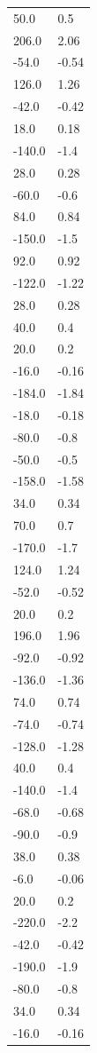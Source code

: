 \begin{longtable}{ll}
50.0 & 0.5 \\
206.0 & 2.06 \\
-54.0 & -0.54 \\
126.0 & 1.26 \\
-42.0 & -0.42 \\
18.0 & 0.18 \\
-140.0 & -1.4 \\
28.0 & 0.28 \\
-60.0 & -0.6 \\
84.0 & 0.84 \\
-150.0 & -1.5 \\
92.0 & 0.92 \\
-122.0 & -1.22 \\
28.0 & 0.28 \\
40.0 & 0.4 \\
20.0 & 0.2 \\
-16.0 & -0.16 \\
-184.0 & -1.84 \\
-18.0 & -0.18 \\
-80.0 & -0.8 \\
-50.0 & -0.5 \\
-158.0 & -1.58 \\
34.0 & 0.34 \\
70.0 & 0.7 \\
-170.0 & -1.7 \\
124.0 & 1.24 \\
-52.0 & -0.52 \\
20.0 & 0.2 \\
196.0 & 1.96 \\
-92.0 & -0.92 \\
-136.0 & -1.36 \\
74.0 & 0.74 \\
-74.0 & -0.74 \\
-128.0 & -1.28 \\
40.0 & 0.4 \\
-140.0 & -1.4 \\
-68.0 & -0.68 \\
-90.0 & -0.9 \\
38.0 & 0.38 \\
-6.0 & -0.06 \\
20.0 & 0.2 \\
-220.0 & -2.2 \\
-42.0 & -0.42 \\
-190.0 & -1.9 \\
-80.0 & -0.8 \\
34.0 & 0.34 \\
-16.0 & -0.16 \\

\end{longtable}
